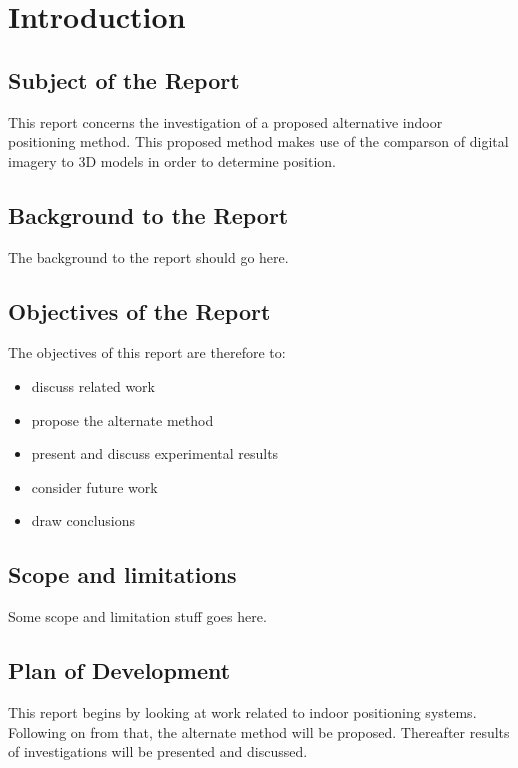 \documentclass[11pt,a4paper]{article}
\begin{document}
\newpage
\tableofcontents

\setcounter{page}{0}

\newpage
\section{Introduction}
	\subsection{Subject of the Report}
		This report concerns the investigation of a proposed alternative indoor positioning method. This proposed method makes use of the comparson of digital imagery to 3D models in order to determine position.
	
	\subsection{Background to the Report}
		The background to the report should go here.
	
	\subsection{Objectives of the Report}
		The objectives of this report are therefore to:
		\begin{itemize}
			\item
				discuss related work
			\item
				propose the alternate method
			\item
				present and discuss experimental results
			\item
				 consider future work
			\item
				draw conclusions
		\end{itemize}
	
	\subsection{Scope and limitations}
		Some scope and limitation stuff goes here.
	
	\subsection{Plan of Development}
		This report begins by looking at work related to indoor positioning systems. Following on from that, the alternate method will be proposed. Thereafter results of investigations will be presented and discussed.
\end{document}
